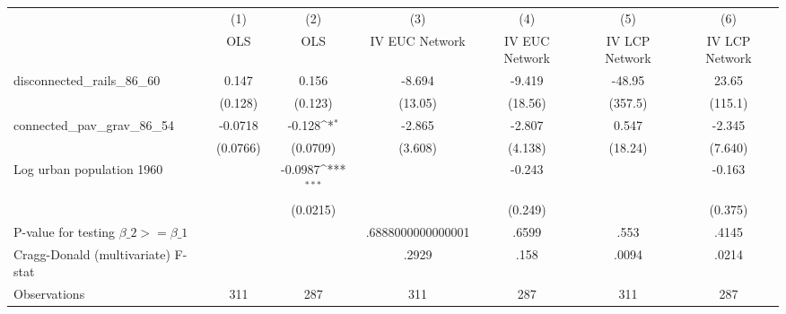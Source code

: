 {
\def\sym#1{\ifmmode^{#1}\else\(^{#1}\)\fi}
\begin{tabular}{l*{6}{c}}
\hline\hline
                &\multicolumn{1}{c}{(1)}&\multicolumn{1}{c}{(2)}&\multicolumn{1}{c}{(3)}&\multicolumn{1}{c}{(4)}&\multicolumn{1}{c}{(5)}&\multicolumn{1}{c}{(6)}\\
                &\multicolumn{1}{c}{OLS}&\multicolumn{1}{c}{OLS}&\multicolumn{1}{c}{IV EUC Network}&\multicolumn{1}{c}{IV EUC Network}&\multicolumn{1}{c}{IV LCP Network}&\multicolumn{1}{c}{IV LCP Network}\\
\hline
disconnected\_rails\_86\_60&    0.147         &    0.156         &   -8.694         &   -9.419         &   -48.95         &    23.65         \\
                &  (0.128)         &  (0.123)         &  (13.05)         &  (18.56)         &  (357.5)         &  (115.1)         \\
[1em]
connected\_pav\_grav\_86\_54&  -0.0718         &   -0.128\sym{*}  &   -2.865         &   -2.807         &    0.547         &   -2.345         \\
                & (0.0766)         & (0.0709)         &  (3.608)         &  (4.138)         &  (18.24)         &  (7.640)         \\
[1em]
Log urban population 1960&                  &  -0.0987\sym{***}&                  &   -0.243         &                  &   -0.163         \\
                &                  & (0.0215)         &                  &  (0.249)         &                  &  (0.375)         \\
\hline
P-value for testing $\beta\_{2} >= \beta\_{1}$&                  &                  &.6888000000000001         &    .6599         &     .553         &    .4145         \\
Cragg-Donald (multivariate) F-stat&                  &                  &    .2929         &     .158         &    .0094         &    .0214         \\
Observations    &      311         &      287         &      311         &      287         &      311         &      287         \\
\hline\hline
\end{tabular}
}
